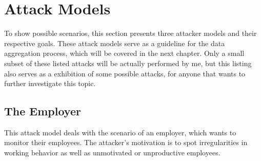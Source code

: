 \section{Attack Models}\label{attack-models}
To show possible scenarios, this section presents three attacker models and their respective goals.
These attack models serve as a guideline for the data aggregation process, which will be covered in the next chapter.
Only a small subset of these listed attacks will be actually performed by me, but this listing also serves as a exhibition of some possible attacks, for anyone that wants to further investigate this topic.

\subsection{The Employer}\label{employer-monitoring}
This attack model deals with the scenario of an employer, which wants to monitor their employees.
The attacker's motivation is to spot irregularities in working behavior as well as unmotivated or unproductive employees.

